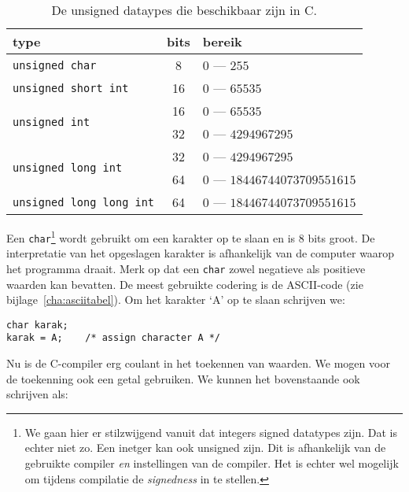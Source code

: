 \begin{table}[!ht]
\centering
\caption{De unsigned dataypes die beschikbaar zijn in C.}
\label{tab:varintdatatypesunsiged}
\begin{tabular}{@{}lcl@{}}
\toprule
\textbf{type}                               & \textbf{bits} & \textbf{bereik}  \\ \midrule
\texttt{unsigned char}                      & 8             & $0$ --- $255$  \\
\texttt{unsigned short int}                 & 16            & $0$ --- $65535$ \\
\multirow{2}{*}{\texttt{unsigned int}}      & 16            & $0$ --- $65535$ \\
                                            & 32            & $0$ --- $4294967295$ \\
\multirow{2}{*}{\texttt{unsigned long int}} & 32            & $0$ --- $4294967295$ \\
                                            & 64            & $0$ --- $18446744073709551615$  \\
\texttt{unsigned long long int}             & 64            & $0$ --- $18446744073709551615$  \\
   \bottomrule
\end{tabular}
\end{table}

Een \texttt{char}\footnote{We gaan hier er stilzwijgend vanuit dat integers signed datatypes zijn. Dat is echter niet zo. Een inetger kan ook unsigned zijn. Dit is afhankelijk van de gebruikte compiler \textsl{en} instellingen van de compiler. Het is echter wel mogelijk om tijdens compilatie de \textsl{signedness} in te stellen.} wordt gebruikt om een karakter op te slaan en is 8 bits groot. De interpretatie van het opgeslagen karakter is afhankelijk van de computer waarop het programma draait. Merk op dat een \texttt{char} zowel negatieve als positieve waarden kan bevatten. De meest gebruikte codering is de ASCII-code (zie bijlage~\ref{cha:asciitabel}). Om het karakter `A' op te slaan schrijven we:

\hspace*{1em}\texttt{char karak;}\\
\hspace*{1em}\texttt{karak = \textquotesingle A\textquotesingle; \ \ \ /* assign character A */}

Nu is de C-compiler erg coulant in het toekennen van waarden. We mogen voor de toekenning ook een getal gebruiken. We kunnen het bovenstaande ook schrijven als:


